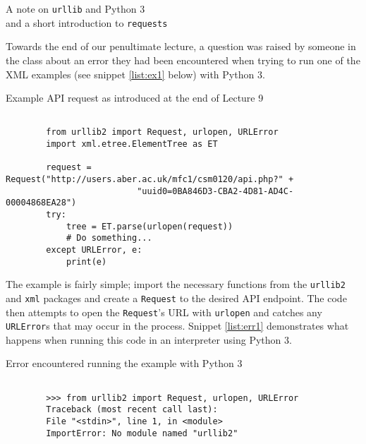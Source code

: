 \documentclass[a4paper]{article}
\begin{document}
\begin{center}
    {\huge{A note on \texttt{urllib} and Python 3}}\\
    {\LARGE{and a short introduction to \texttt{requests}}}
\noindent\makebox[\linewidth]{\rule{\paperwidth}{0.4pt}}
\end{center}

\vskip 0.5cm

Towards the end of our penultimate lecture, a question was raised by someone in
the class about an error they had been encountered when trying to run one of the
XML examples (see snippet \ref{list:ex1} below) with Python 3.

\begin{listing}[H]
    \caption[]{Example API request as introduced at the end of Lecture 9}
    \label{list:ex1}
    \begin{verbatim}

        from urllib2 import Request, urlopen, URLError
        import xml.etree.ElementTree as ET

        request = Request("http://users.aber.ac.uk/mfc1/csm0120/api.php?" +
                          "uuid0=0BA846D3-CBA2-4D81-AD4C-00004868EA28")
        try:
            tree = ET.parse(urlopen(request))
            # Do something...
        except URLError, e:
            print(e)

    \end{verbatim}
\end{listing}

The example is fairly simple; import the necessary functions from the \texttt{urllib2}
and \texttt{xml} packages and create a \texttt{Request} to the desired API endpoint. The code
then attempts to open the \texttt{Request}'s URL with \texttt{urlopen} and
catches any \texttt{URLError}s that may occur in the process. Snippet \ref{list:err1}
demonstrates what happens when running this code in an interpreter using Python 3.

\begin{listing}[H]
    \caption[]{Error encountered running the example with Python 3}
    \label{list:err1}
    \begin{verbatim}

        >>> from urllib2 import Request, urlopen, URLError
        Traceback (most recent call last):
        File "<stdin>", line 1, in <module>
        ImportError: No module named "urllib2"

    \end{verbatim}
\end{listing}
\end{document}
